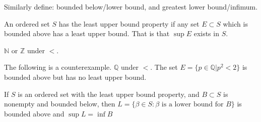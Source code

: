 Similarly define: bounded below/lower bound, and greatest lower bound/infimum.

\begin{defn-dan}
  An ordered set $S$ has the least upper bound property if any set $E\subset S$ which is bounded above has a least upper bound.
  That is that $\sup E$ exists in $S$.
\end{defn-dan}

\begin{example}[]
  $\mathbb{N}$ or $\mathbb{Z}$ under $<$.
\end{example}

\begin{example}[]
  The following is a counterexample.
  $\mathbb{Q}$ under $<$.
  The set $E=\{p\in \mathbb{Q}|p^{2}<2\}$ is bounded above but has no least upper bound.
\end{example}

\begin{thm-dan}[1.11]
  If $S$ is an ordered set with the least upper bound property, and $B\subset S$ is nonempty and bounded below, then $L=\{\beta\in S:\beta \text{ is a lower bound for }B\}$ is bounded above and $\sup L= \inf B$
\end{thm-dan}


